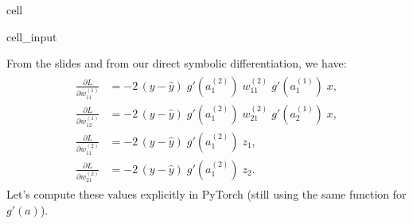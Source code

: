\documentclass[letterpaper,10pt,english]{jupyterBook}
\begin{document}
\begin{sphinxuseclass}{cell}\begin{sphinxVerbatimInput}

\begin{sphinxuseclass}{cell_input}
\begin{sphinxVerbatim}[commandchars=\\\{\}]
    
    

    
    

        
  

    
\end{sphinxVerbatim}

\end{sphinxuseclass}\end{sphinxVerbatimInput}

\end{sphinxuseclass}
\sphinxAtStartPar
{}

\sphinxAtStartPar
From the slides and from our direct symbolic differentiation, we have:
\begin{equation*}
\begin{split}\begin{aligned}
\frac{\partial L}{\partial w_{11}^{(1)}} 
&= -2 \,(y - \hat{y})\; g'(a_1^{(2)})\; w_{11}^{(2)}\; g'(a_1^{(1)})\; x,\\
\frac{\partial L}{\partial w_{12}^{(1)}} 
&= -2 \,(y - \hat{y})\; g'(a_1^{(2)})\; w_{21}^{(2)}\; g'(a_2^{(1)})\; x,\\
\frac{\partial L}{\partial w_{11}^{(2)}} 
&= -2 \,(y - \hat{y})\; g'(a_1^{(2)})\; z_1,\\
\frac{\partial L}{\partial w_{21}^{(2)}} 
&= -2 \,(y - \hat{y})\; g'(a_1^{(2)})\; z_2.
\end{aligned}\end{split}
\end{equation*}
\sphinxAtStartPar
Let’s compute these values explicitly in PyTorch (still using the same  function for \(g'(a)\)).
\end{document}
